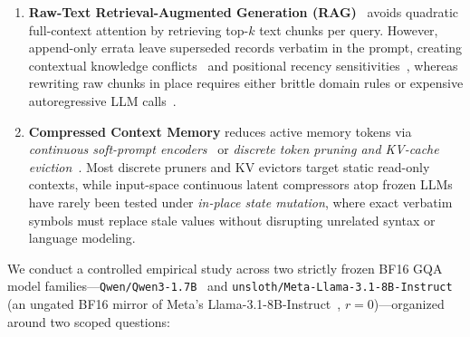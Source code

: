 \documentclass[10pt]{article}
\renewcommand{\_}{\origunderscore\allowbreak}
\begin{document}
\begin{enumerate}
    \item \textbf{Raw-Text Retrieval-Augmented Generation (RAG)}~\citep{lewis2020rag,robertson2009bm25,xiao2024bge} avoids quadratic full-context attention by retrieving top-$k$ text chunks per query. However, append-only errata leave superseded records verbatim in the prompt, creating contextual knowledge conflicts~\citep{longpre2021conflict} and positional recency sensitivities~\citep{liu2024lost}, whereas rewriting raw chunks in place requires either brittle domain rules or expensive autoregressive LLM calls~\citep{packer2023memgpt,chhikara2025mem0}.
    \item \textbf{Compressed Context Memory} reduces active memory tokens via \emph{continuous soft-prompt encoders}~\citep{mu2023gist,chevalier2023autocompressors,ge2024icae,cheng2024xrag,li2025compressor500x,fallahpour2026memorilla} or \emph{discrete token pruning and KV-cache eviction}~\citep{pan2024llmlingua2,chirkova2025provence,zhang2023h2o,li2024snapkv}. Most discrete pruners and KV evictors target static read-only contexts, while input-space continuous latent compressors atop frozen LLMs have rarely been tested under \emph{in-place state mutation}, where exact verbatim symbols must replace stale values without disrupting unrelated syntax or language modeling.
\end{enumerate}

We conduct a controlled empirical study across two strictly frozen BF16 GQA model families---\texttt{Qwen/Qwen3-1.7B}~\citep{yang2025qwen3} and \texttt{unsloth/Meta-Llama-3.1-8B-Instruct} (an ungated BF16 mirror of Meta's Llama-3.1-8B-Instruct~\citep{dubey2024llama3}, $r=0$)---organized around two scoped questions:
\end{document}
